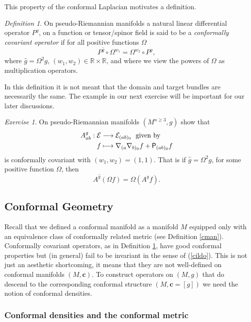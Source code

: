 \documentclass[a4paper,12pt]{amsart}
\newcommand{\V}{\mbox{\sf P}}
\newcommand{\cc}{\boldsymbol{c}}
\theoremstyle{remark}
\newcommand{\nn}[1]{(\ref{#1})}
\newtheorem{exe}{Exercise}
\newtheorem{definition}{Definition}
\begin{document}
This property of the conformal Laplacian motivates a definition. 
\begin{definition}\label{ccov}
On pseudo-Riemannian manifolds a natural linear differential operator
$P^g$, on a function or tensor/spinor field is said to be a {\em conformally
  covariant operator} if for all positive functions $\Omega$
$$
P^{\widehat{g}} \circ \Omega^{w_1}= \Omega^{w_2}\circ 
P^g   ,
$$ 
where $\widehat{g}=\Omega^2 g$, $(w_1,w_2)\in \mathbb{R}\times \mathbb{R}$, 
and where we view
the powers of
$\Omega$ as multiplication operators.
\end{definition}
\noindent In this definition it is not meant that the
domain and target bundles are necessarily the same. The example in our next
exercise will be important for our later discussions.
\begin{exe}\label{AEex} On pseudo-Riemannian manifolds $(M^{n\geq3},g)$ 
show that
\begin{equation}\label{eq:AE}
\begin{split}
 A^g_{ab}:\mathcal{E}&\longrightarrow\mathcal{E}_{(ab)_0} \; \mbox{ given
   by}\\ f &\longmapsto\nabla_{(a}\nabla_{b)_0} f +\V_{(ab)_0} f
\end{split}
\end{equation}
is conformally covariant with $(w_1,w_2)=(1,1)$. 
That is if 
$\widehat{g}=\Omega^2 g$, for some positive function $\Omega$, then 
$$
A^{\widehat{g}} (\Omega f) = \Omega (A^g f) .
$$
\end{exe}



\subsection{Conformal Geometry}\label{cg}

Recall that we defined a conformal manifold as a manifold $M$ equipped
only with an equivalence class of conformally related metric (see
Definition \ref{cman}).  Conformally covariant operators, as in
Definition \ref{ccov}, have good conformal properties but (in general)
fail to be invariant in the sense of \nn{cildo}. This is not just an
aesthetic shortcoming, it means that they are not well-defined on
conformal manifolds $(M,\cc)$. To construct operators on $(M,g)$ that do
descend to the corresponding conformal structure $(M,\cc=[g])$ we need
the notion of conformal densities. 


\subsubsection{Conformal densities and the conformal metric}
\end{document}
